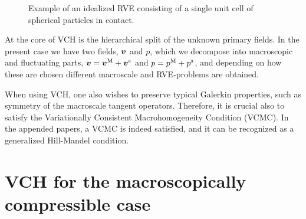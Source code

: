 \documentclass[MikaelDissertation.tex]{subfiles}
\begin{document}
\begin{figure}[htpb!]
\centering
{}
\caption{Example of an idealized RVE consisting of a single unit cell of spherical particles in contact.}
\label{fig:rve_example}
\end{figure}

At the core of VCH is the hierarchical split of the unknown primary fields.
In the present case we have two fields, $\boldsymbol{v}$ and $p$, which we decompose into macroscopic and fluctuating parts, $\boldsymbol{v} = \boldsymbol{v}^{\mathrm{M}} + \boldsymbol{v}^{\mathrm{s}}$ and $p = p^{\mathrm{M}} + p^{\mathrm{s}}$, and depending on how these are chosen different macroscale and RVE-problems are obtained.

When using VCH, one also wishes to preserve typical Galerkin properties, such as symmetry of the macroscale tangent operators.
Therefore, it is crucial also to satisfy the Variationally Consistent Macrohomogeneity Condition (VCMC).
In the appended papers, a VCMC is indeed satisfied, and it can be recognized as a generalized Hill-Mandel condition.


\section{VCH for the macroscopically compressible case}
\end{document}
